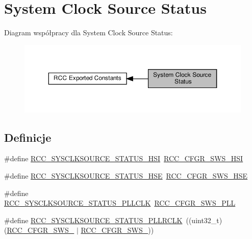 \hypertarget{group___r_c_c___system___clock___source___status}{}\section{System Clock Source Status}
\label{group___r_c_c___system___clock___source___status}
Diagram współpracy dla System Clock Source Status\+:\nopagebreak
\begin{figure}[H]
\begin{center}
\leavevmode
\includegraphics[width=350pt]{group___r_c_c___system___clock___source___status}
\end{center}
\end{figure}
\subsection*{Definicje}
\begin{DoxyCompactItemize}
\item 
\#define \hyperlink{group___r_c_c___system___clock___source___status_ga0d6c2b0b2d59e6591295649853bb2abd}{R\+C\+C\+\_\+\+S\+Y\+S\+C\+L\+K\+S\+O\+U\+R\+C\+E\+\_\+\+S\+T\+A\+T\+U\+S\+\_\+\+H\+SI}~\hyperlink{group___peripheral___registers___bits___definition_ga6764639cf221e1ebc0b5448dcaed590a}{R\+C\+C\+\_\+\+C\+F\+G\+R\+\_\+\+S\+W\+S\+\_\+\+H\+SI}
\item 
\#define \hyperlink{group___r_c_c___system___clock___source___status_ga3847769265bf19becf7b976a7e908a64}{R\+C\+C\+\_\+\+S\+Y\+S\+C\+L\+K\+S\+O\+U\+R\+C\+E\+\_\+\+S\+T\+A\+T\+U\+S\+\_\+\+H\+SE}~\hyperlink{group___peripheral___registers___bits___definition_gae09a0202f441c1a43e69c62331d50a08}{R\+C\+C\+\_\+\+C\+F\+G\+R\+\_\+\+S\+W\+S\+\_\+\+H\+SE}
\item 
\#define \hyperlink{group___r_c_c___system___clock___source___status_ga4f05019ec09da478d084f44dbaad7d6d}{R\+C\+C\+\_\+\+S\+Y\+S\+C\+L\+K\+S\+O\+U\+R\+C\+E\+\_\+\+S\+T\+A\+T\+U\+S\+\_\+\+P\+L\+L\+C\+LK}~\hyperlink{group___peripheral___registers___bits___definition_ga2c67e2279804a83ef24438267d9d4a6c}{R\+C\+C\+\_\+\+C\+F\+G\+R\+\_\+\+S\+W\+S\+\_\+\+P\+LL}
\item 
\#define \hyperlink{group___r_c_c___system___clock___source___status_gafb2aec046cc6759c3b290a3eeebe7d75}{R\+C\+C\+\_\+\+S\+Y\+S\+C\+L\+K\+S\+O\+U\+R\+C\+E\+\_\+\+S\+T\+A\+T\+U\+S\+\_\+\+P\+L\+L\+R\+C\+LK}~((uint32\+\_\+t)(\hyperlink{group___peripheral___registers___bits___definition_ga1eae59112c51def51979e31e8695b39f}{R\+C\+C\+\_\+\+C\+F\+G\+R\+\_\+\+S\+W\+S\+\_} $\vert$ \hyperlink{group___peripheral___registers___bits___definition_gaad3a5718999d7259f216137a23c2a379}{R\+C\+C\+\_\+\+C\+F\+G\+R\+\_\+\+S\+W\+S\+\_}))
\end{DoxyCompactItemize}


